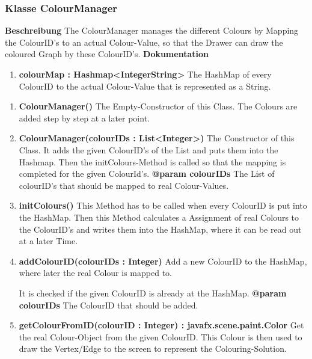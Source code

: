 \documentclass{article}
\newcommand{\myclass}[1]{\subsubsection*{Klasse #1} \label{#1} \addcontentsline{toc}{subsubsection}{\nameref{#1}}}
\begin{document}
			\myclass{ColourManager}
				\textbf{Beschreibung}\newline
				The ColourManager manages the different Colours by Mapping the ColourID's to an actual Colour-Value, so that the Drawer can draw the coloured Graph by these ColourID's.
				\textbf{Dokumentation}\newline
				\begin{enumerate}[-]
					\item{
						\textbf{colourMap : Hashmap<IntegerString>} \newline
						The HashMap of every ColourID to the actual Colour-Value that is represented as a String.
					}
				\end{enumerate}
				\begin{enumerate}[+]
					\item{
						\textbf{ColourManager()} \newline
						The Empty-Constructor of this Class.
						The Colours are added step by step at a later point.
						\newline
					}
					\item{
						\textbf{ColourManager(colourIDs : List<Integer>)} \newline
						The Constructor of this Class.
						It adds the given ColourID's of the List and puts them into the Hashmap.
						Then the initColours-Method is called so that the mapping is completed for the given ColourId's.
						\newline
						\textbf{@param colourIDs}
							The List of colourID's that should be mapped to real Colour-Values.
							\newline
					}
					\item{
						\textbf{initColours()} \newline
						This Method has to be called when every ColourID is put into the HashMap.
						Then this Method calculates a Assignment of real Colours to the ColourID's and writes them into the HashMap, where it can be read out at a later Time.
						\newline
					}
					\item{
						\textbf{addColourID(colourIDs : Integer)} \newline
						Add a new ColourID to the HashMap, where later the real Colour is mapped to.
						
						It is checked if the given ColourID is already at the HashMap.
						\newline
						\textbf{@param colourIDs}
							The ColourID that should be added.
							\newline
					}
					\item{
						\textbf{getColourFromID(colourID : Integer) : javafx.scene.paint.Color} \newline
						Get the real Colour-Object from the given ColourID.
						This Colour is then used to draw the Vertex/Edge to the screen to represent the Colouring-Solution.
						
}
\end{enumerate}
\end{document}
